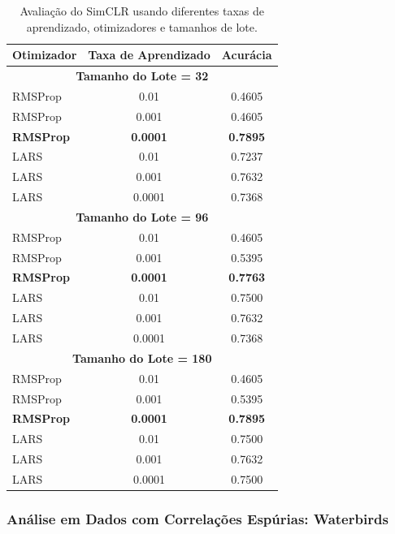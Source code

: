 \begin{table}[h] %
  \caption{Avaliação do SimCLR usando diferentes taxas de aprendizado, otimizadores e tamanhos de lote.}
  \label{tab:linear_eval_results}
  \centering
  \setlength{\tabcolsep}{6pt}
  \begin{tabular}{lcc}
    \toprule
    Otimizador & Taxa de Aprendizado & Acurácia \\
    \midrule
    \multicolumn{3}{c}{\textbf{Tamanho do Lote = 32}} \\
    \midrule
    RMSProp  & 0.01     & 0.4605 \\
    RMSProp  & 0.001    & 0.4605 \\
    \textbf{RMSProp}  & \textbf{0.0001}   & \textbf{0.7895} \\
    LARS     & 0.01     & 0.7237 \\
    LARS     & 0.001    & 0.7632 \\
    LARS     & 0.0001   & 0.7368 \\
    \midrule
    \multicolumn{3}{c}{\textbf{Tamanho do Lote = 96}} \\
    \midrule
    RMSProp  & 0.01     & 0.4605 \\
    RMSProp  & 0.001    & 0.5395 \\
    \textbf{RMSProp}  & \textbf{0.0001}   & \textbf{0.7763} \\
    LARS     & 0.01     & 0.7500 \\
    LARS     & 0.001    & 0.7632 \\
    LARS     & 0.0001   & 0.7368 \\
    \midrule
    \multicolumn{3}{c}{\textbf{Tamanho do Lote = 180}} \\
    \midrule
    RMSProp  & 0.01     & 0.4605 \\
    RMSProp  & 0.001    & 0.5395 \\
    \textbf{RMSProp}  & \textbf{0.0001}   & \textbf{0.7895} \\
    LARS     & 0.01     & 0.7500 \\
    LARS     & 0.001    & 0.7632 \\
    LARS     & 0.0001   & 0.7500 \\
    \bottomrule
  \end{tabular}
\end{table}

\subsubsection{Análise em Dados com Correlações Espúrias: Waterbirds}

